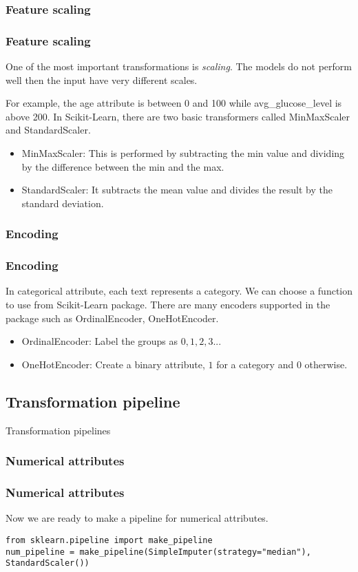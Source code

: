 \documentclass[10pt]{beamer}
\theoremstyle{definition}
\theoremstyle{remark}
\numberwithin{equation}{section}
\begin{document}
\subsubsection{Feature scaling}
\begin{frame}\frametitle{Feature scaling}
	One of the most important transformations is \textit{scaling}. The models do not perform well then the input have very different scales. 
	
	For example, the age attribute is between 0 and 100 while avg\_glucose\_level is above 200.
	In Scikit-Learn, there are two basic transformers called MinMaxScaler and StandardScaler.
	
	\begin{itemize}
		\item MinMaxScaler: This is performed by subtracting the min value and dividing by the difference between the min and the max.
		
		\item StandardScaler: It subtracts the mean value and divides the result by the standard deviation.
	\end{itemize}
\end{frame}

\subsubsection{Encoding}
\begin{frame}\frametitle{Encoding}
	In categorical attribute, each text represents a category. We can choose a function to use from Scikit-Learn package. There are many encoders supported in the package such as OrdinalEncoder, OneHotEncoder.
	
	\begin{itemize}
		\item OrdinalEncoder: Label the groups as $0,1,2,3...$
		\item  OneHotEncoder: Create a binary attribute, $1$ for a category and $0$ otherwise. 
	\end{itemize}
\end{frame}

\subsection{Transformation pipeline}
\begin{frame}
	\centering \large Transformation pipelines
\end{frame}
\subsubsection{Numerical attributes}
\begin{frame}[fragile]
	\frametitle{Numerical attributes}
Now we are ready to make a pipeline for numerical attributes.
\begin{lstlisting}
from sklearn.pipeline import make_pipeline
num_pipeline = make_pipeline(SimpleImputer(strategy="median"), StandardScaler())
\end{lstlisting}
\end{frame}
\end{document}
